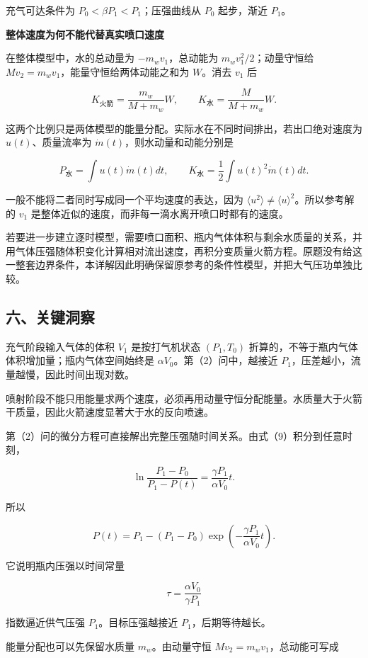 \documentclass[12pt,a4paper,UTF8]{ctexart}
\begin{document}
充气可达条件为 \(P_0<\beta P_1<P_1\)；压强曲线从 \(P_0\) 起步，渐近
\(P_1\)。

\textbf{整体速度为何不能代替真实喷口速度}

在整体模型中，水的总动量为 \(-m_wv_1\)，总动能为
\(m_wv_1^2/2\)；动量守恒给 \(Mv_2=m_wv_1\)，能量守恒给两体动能之和为
\(W\)。消去 \(v_1\) 后

\[K_{\text{火箭}}=\frac{m_w}{M+m_w}W,\qquad K_{\text{水}}=\frac M{M+m_w}W.\]

这两个比例只是两体模型的能量分配。实际水在不同时间排出，若出口绝对速度为
\(u(t)\)、质量流率为 \(\dot m(t)\)，则水动量和动能分别是

\[P_{\text{水}}=\int u(t)\dot m(t)dt,\qquad K_{\text{水}}=\frac12\int u(t)^2\dot m(t)dt.\]

一般不能将二者同时写成同一个平均速度的表达，因为
\(\langle u^2\rangle\ne\langle u\rangle^2\)。所以参考解的 \(v_1\)
是整体近似的速度，而非每一滴水离开喷口时都有的速度。

若要进一步建立逐时模型，需要喷口面积、瓶内气体体积与剩余水质量的关系，并用气体压强随体积变化计算相对流出速度，再积分变质量火箭方程。原题没有给这一整套边界条件，本详解因此明确保留原参考的条件性模型，并把大气压功单独比较。

\subsection{六、关键洞察}\label{ux516dux5173ux952eux6d1eux5bdf-6}

充气阶段输入气体的体积 \(V_1\) 是按打气机状态 \((P_1,T_0)\)
折算的，不等于瓶内气体体积增加量；瓶内气体空间始终是
\(\alpha V_0\)。第（2）问中，越接近
\(P_1\)，压差越小，流量越慢，因此时间出现对数。

喷射阶段不能只用能量求两个速度，必须再用动量守恒分配能量。水质量大于火箭干质量，因此火箭速度显著大于水的反向喷速。

第（2）问的微分方程可直接解出完整压强随时间关系。由式（9）积分到任意时刻，

\[
\ln\frac{P_1-P_0}{P_1-P(t)}
=\frac{\gamma P_1}{\alpha V_0}t.
\]

所以

\[
P(t)
=P_1-(P_1-P_0)
\exp\left(
-\frac{\gamma P_1}{\alpha V_0}t
\right).
\]

它说明瓶内压强以时间常量

\[
\tau=\frac{\alpha V_0}{\gamma P_1}
\]

指数逼近供气压强 \(P_1\)。目标压强越接近 \(P_1\)，后期等待越长。

能量分配也可以先保留水质量 \(m_w\)。由动量守恒
\(Mv_2=m_wv_1\)，总动能可写成
\end{document}
